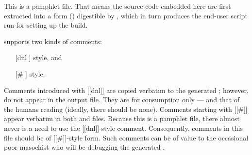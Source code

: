 \documentclass[12pt]{article}
\begin{document}
This is a pamphlet file.  That means the source code embedded here
are first extracted into a form () digestible by
, which in turn produces the end-user 
script run for setting up the build.

 supports two kinds of comments:
\begin{enumerate}
\item [[dnl]] style, and
\item [[#]] style.
\end{enumerate}
Comments introduced with [[dnl]] are copied verbatim to the generated
; however, do not appear in the 
output file.  They are for  consumption only --- and that
of the humans reading  (ideally, there should be none).
Comments starting with [[#]] appear verbatim in both 
and  files.  Because this is a pamphlet file, there almost
never is a need to use the [[dnl]]-style comment.
Consequently,  comments in this file should be
of [[#]]-style form.  Such comments can be of value to the occasional
poor masochist who will be debugging the generated .
\end{document}
